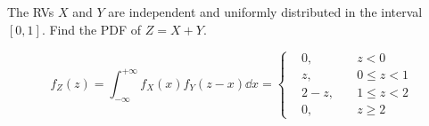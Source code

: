\begin{example}
    The RVs $X$ and $Y$ are independent and uniformly distributed in the interval $[0, 1]$. Find the PDF of $Z = X +Y$.
\end{example}
\begin{solution}
    \begin{equation}
        f_{Z}(z) = \int_{-\infty}^{+\infty} f_{X}(x) f_{Y}(z - x) \dd{x} = \left\{\begin{aligned}
            &0, \quad &z < 0 \\ 
            &z, \quad &0 \leq z < 1 \\ 
            &2 - z, \quad &1 \leq z < 2 \\
            &0, \quad &z \geq 2
        \end{aligned}\right.
    \end{equation}
\end{solution}

